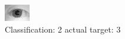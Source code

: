 \begin{figure}[h!]
\begin{center}
\includegraphics[width=0.60\columnwidth]{figures/ID1054_class_2_target_3.png}
\end{center}
\caption{ Classification: 2 actual target: 3}
\label{fig:ID1054_class_2_target_3}
\end{figure}

